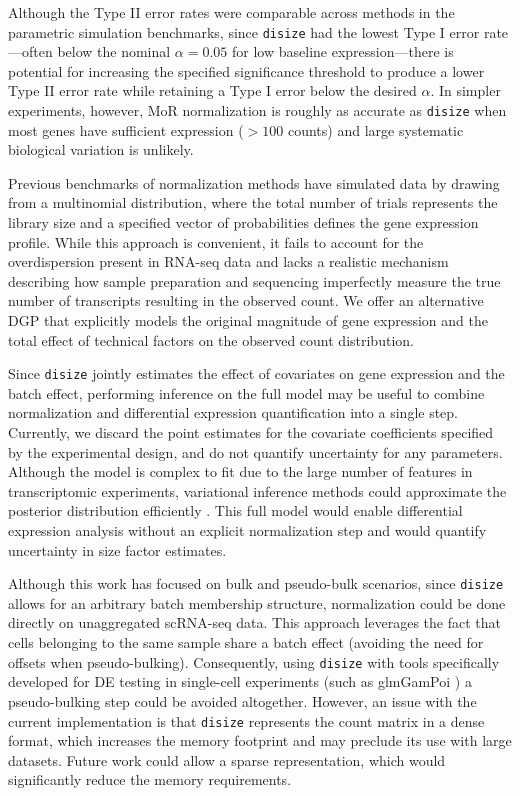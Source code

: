 \documentclass[10pt,letterpaper]{article}
\begin{document}
Although the Type II error rates were comparable across methods in the parametric simulation benchmarks, since \texttt{disize} had the lowest Type I error rate---often below the nominal $\alpha = 0.05$ for low baseline expression---there is potential for increasing the specified significance threshold to produce a lower Type II error rate while retaining a Type I error below the desired $\alpha$.
In simpler experiments, however, MoR normalization is roughly as accurate as \texttt{disize} when most genes have sufficient expression ($> 100$ counts) and large systematic biological variation is unlikely.

Previous benchmarks of normalization methods \cite{robinsonScalingNormalizationMethod2010,liChoiceLibrarySize2020} have simulated data by drawing from a multinomial distribution, where the total number of trials represents the library size and a specified vector of probabilities defines the gene expression profile. 
While this approach is convenient, it fails to account for the overdispersion present in RNA-seq data and lacks a realistic mechanism describing how sample preparation and sequencing imperfectly measure the true number of transcripts resulting in the observed count.
We offer an alternative DGP that explicitly models the original magnitude of gene expression and the total effect of technical factors on the observed count distribution.

Since \texttt{disize} jointly estimates the effect of covariates on gene expression and the batch effect, performing inference on the full model may be useful to combine normalization and differential expression quantification into a single step.
Currently, we discard the point estimates for the covariate coefficients specified by the experimental design, and do not quantify uncertainty for any parameters.
Although the model is complex to fit due to the large number of features in transcriptomic experiments, variational inference methods could approximate the posterior distribution efficiently \cite{bleiVariationalInferenceReview2017}. 
This full model would enable differential expression analysis without an explicit normalization step and would quantify uncertainty in size factor estimates.

Although this work has focused on bulk and pseudo-bulk scenarios, since \texttt{disize} allows for an arbitrary batch membership structure, normalization could be done directly on unaggregated scRNA-seq data. 
This approach leverages the fact that cells belonging to the same sample share a batch effect (avoiding the need for offsets when pseudo-bulking). 
Consequently, using \texttt{disize} with tools specifically developed for DE testing in single-cell experiments (such as glmGamPoi \cite{ahlmann-eltzeGlmGamPoiFittingGammaPoisson2021}) a pseudo-bulking step could be avoided altogether. 
However, an issue with the current implementation is that \texttt{disize} represents the count matrix in a dense format, which increases the memory footprint and may preclude its use with large datasets. 
Future work could allow a sparse representation, which would significantly reduce the memory requirements.
\end{document}

